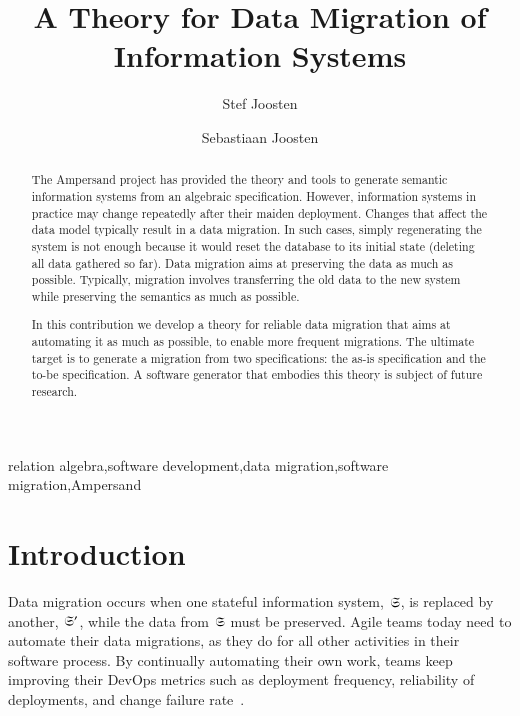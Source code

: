 \documentclass{elsarticle}
\begin{document}


\title{A Theory for Data Migration of Information Systems}
\author[ou,ordina]{Stef Joosten}
\author[umn]{Sebastiaan Joosten}
\address[ou]{Open Universiteit Nederland, Heerlen, the Netherlands}
\address[ordina]{Ordina NV, Nieuwegein, the Netherlands}
\address[umn]{University of Minnesota, Minneapolis, USA}

\begin{abstract}
	The Ampersand project has provided the theory and tools to generate semantic information systems from an algebraic specification.
	However, information systems in practice may change repeatedly after their maiden deployment.
	Changes that affect the data model typically result in a data migration.
	In such cases, simply regenerating the system is not enough because it would reset the database to its initial state (deleting all data gathered so far).
	Data migration aims at preserving the data as much as possible.
	Typically, migration involves transferring the old data to the new system while preserving the semantics as much as possible.

	In this contribution we develop a theory for reliable data migration that aims at automating it as much as possible,
	to enable more frequent migrations.
	The ultimate target is to generate a migration from two specifications: the as-is specification and the to-be specification.
	A software generator that embodies this theory is subject of future research.
\end{abstract}

\begin{keyword}
relation algebra\sep software development\sep data migration\sep software migration\sep Ampersand
\end{keyword}
\maketitle

\section{Introduction}
\label{sct:Introduction}
	Data migration occurs when one stateful information system, $\mathfrak{S}$, is replaced by another, $\mathfrak{S}'$,
	while the data from $\mathfrak{S}$ must be preserved.
	Agile teams today need to automate their data migrations, 
	as they do for all other activities in their software process.
	By continually automating their own work,
	teams keep improving their DevOps metrics such as deployment frequency, reliability of deployments, and change failure rate~\cite{DevOps2021}.
\end{document}
